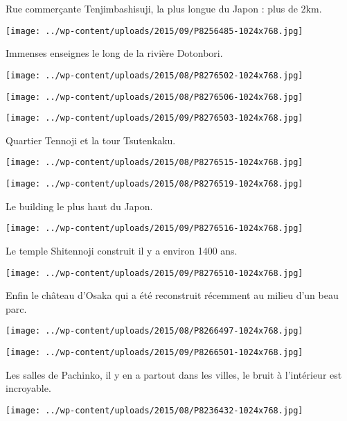  Rue commerçante Tenjimbashisuji, la plus longue du Japon : plus de 2km.
\begin{center} \texttt{[image: ../wp-content/uploads/2015/09/P8256485-1024x768.jpg]} \end{center}

\pagebreak
 Immenses enseignes le long de la rivière Dotonbori.
\begin{center} \texttt{[image: ../wp-content/uploads/2015/08/P8276502-1024x768.jpg]} \end{center}
\begin{center} \texttt{[image: ../wp-content/uploads/2015/08/P8276506-1024x768.jpg]} \end{center}
\begin{center} \texttt{[image: ../wp-content/uploads/2015/09/P8276503-1024x768.jpg]} \end{center}

 Quartier Tennoji et la tour Tsutenkaku.
\begin{center} \texttt{[image: ../wp-content/uploads/2015/08/P8276515-1024x768.jpg]} \end{center}
\begin{center} \texttt{[image: ../wp-content/uploads/2015/08/P8276519-1024x768.jpg]} \end{center}

 Le building le plus haut du Japon.
\begin{center} \texttt{[image: ../wp-content/uploads/2015/09/P8276516-1024x768.jpg]} \end{center}

\pagebreak
 Le temple Shitennoji construit il y a environ 1400 ans.
\begin{center} \texttt{[image: ../wp-content/uploads/2015/09/P8276510-1024x768.jpg]} \end{center}

  Enfin le château d'Osaka qui a été reconstruit récemment au milieu d'un beau parc.
\begin{center} \texttt{[image: ../wp-content/uploads/2015/08/P8266497-1024x768.jpg]} \end{center}
\begin{center} \texttt{[image: ../wp-content/uploads/2015/09/P8266501-1024x768.jpg]} \end{center}

 Les salles de Pachinko, il y en a partout dans les villes, le bruit à l'intérieur est incroyable. 
\begin{center} \texttt{[image: ../wp-content/uploads/2015/08/P8236432-1024x768.jpg]} \end{center}

